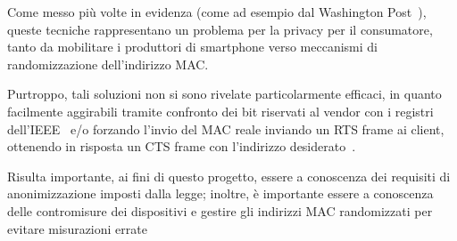 


Come messo più volte in evidenza (come ad esempio dal Washington Post~\cite{Fung2013}), queste tecniche rappresentano un problema per la privacy per il consumatore,
tanto da mobilitare i produttori di smartphone verso meccanismi di randomizzazione dell'indirizzo MAC\@.

Purtroppo, tali soluzioni non si sono rivelate particolarmente efficaci, in quanto facilmente aggirabili
tramite confronto dei bit riservati al vendor con i registri dell'IEEE~\cite{Claburn2017} e/o forzando l'invio del MAC reale inviando un RTS frame ai client, ottenendo in risposta un CTS frame con l'indirizzo desiderato~\cite{Martin2017}.


Risulta importante, ai fini di questo progetto, essere a conoscenza dei requisiti di anonimizzazione imposti dalla legge;
inoltre, è importante essere a conoscenza delle contromisure dei dispositivi e gestire gli indirizzi MAC randomizzati per evitare misurazioni errate

